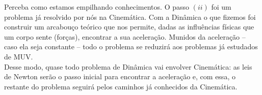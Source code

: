 \begin{exemplo}[Nível II]
Perceba como estamos empilhando conhecimentos. O passo $(ii)$ foi um problema já resolvido por nós na Cinemática. Com a Dinâmica o que fizemos foi construir um arcabouço teórico que nos permite, dadas as influências físicas que um corpo sente (forças), encontrar a sua aceleração. Munidos da aceleração -- caso ela seja constante -- todo o problema se reduzirá aos problemas já estudados de MUV.\\

Desse modo, quase todo problema de Dinâmica vai envolver Cinemática: as leis de Newton serão o passo inicial para encontrar a aceleração e, com essa, o restante do problema seguirá pelos caminhos já conhecidos da Cinemática.


\end{exemplo}






\vspace{0.3cm}





